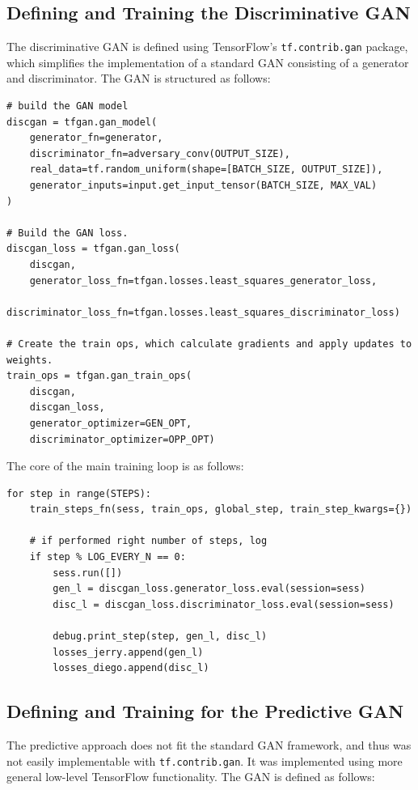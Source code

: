 \documentclass[12pt, titlepage]{report}
\theoremstyle{definition}
\begin{document}
\subsection{Defining and Training the Discriminative GAN}\label{subsection:training_disc}
The discriminative GAN is defined using TensorFlow's \texttt{tf.contrib.gan} package, which simplifies the implementation of a standard GAN consisting of a generator and discriminator. The GAN is structured as follows:

\begin{verbatim}
# build the GAN model
discgan = tfgan.gan_model(
    generator_fn=generator,
    discriminator_fn=adversary_conv(OUTPUT_SIZE),
    real_data=tf.random_uniform(shape=[BATCH_SIZE, OUTPUT_SIZE]),
    generator_inputs=input.get_input_tensor(BATCH_SIZE, MAX_VAL)
)

# Build the GAN loss.
discgan_loss = tfgan.gan_loss(
    discgan,
    generator_loss_fn=tfgan.losses.least_squares_generator_loss,
    discriminator_loss_fn=tfgan.losses.least_squares_discriminator_loss)

# Create the train ops, which calculate gradients and apply updates to weights.
train_ops = tfgan.gan_train_ops(
    discgan,
    discgan_loss,
    generator_optimizer=GEN_OPT,
    discriminator_optimizer=OPP_OPT)
\end{verbatim}

The core of the main training loop is as follows:

\begin{verbatim}
for step in range(STEPS):
    train_steps_fn(sess, train_ops, global_step, train_step_kwargs={})

    # if performed right number of steps, log
    if step % LOG_EVERY_N == 0:
        sess.run([])
        gen_l = discgan_loss.generator_loss.eval(session=sess)
        disc_l = discgan_loss.discriminator_loss.eval(session=sess)

        debug.print_step(step, gen_l, disc_l)
        losses_jerry.append(gen_l)
        losses_diego.append(disc_l)
\end{verbatim}

\subsection{Defining and Training for the Predictive GAN}\label{subsection:training_pred}
The predictive approach does not fit the standard GAN framework, and thus was not easily implementable with \texttt{tf.contrib.gan}. It was implemented using more general low-level TensorFlow functionality. The GAN is defined as follows:
\end{document}

